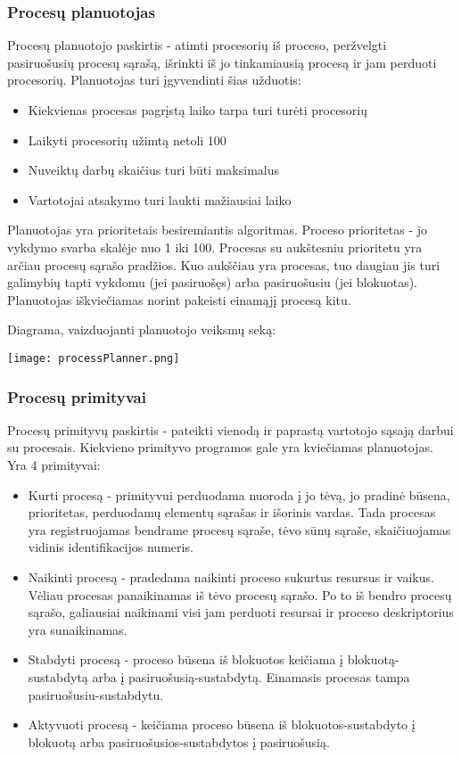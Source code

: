 \subsubsection{Procesų planuotojas}
Procesų planuotojo paskirtis - atimti procesorių iš proceso, peržvelgti pasiruošusių procesų sąrašą, išrinkti iš jo tinkamiausią procesą ir jam perduoti procesorių.
Planuotojas turi įgyvendinti šias užduotis:
	\begin{itemize}
		\item Kiekvienas procesas pagrįstą laiko tarpa turi turėti procesorių
		\item Laikyti procesorių užimtą netoli 100%
		\item Nuveiktų darbų skaičius turi būti maksimalus
		\item Vartotojai atsakymo turi laukti mažiausiai laiko
	\end{itemize}

Planuotojas yra prioritetais besiremiantis algoritmas. Proceso prioritetas - jo vykdymo svarba skalėje nuo 1 iki 100. Procesas su aukštesniu prioritetu yra arčiau procesų sąrašo pradžios.
Kuo aukščiau yra procesas, tuo daugiau jis turi galimybių tapti vykdomu (jei pasiruošęs) arba pasiruošusiu (jei blokuotas). Planuotojas iškviečiamas norint pakeisti einamąjį procesą kitu.

Diagrama, vaizduojanti planuotojo veiksmų seką:

\texttt{[image: processPlanner.png]}

\subsubsection{Procesų primityvai}
Procesų primityvų paskirtis - pateikti vienodą ir paprastą vartotojo sąsają darbui su procesais. Kiekvieno primityvo programos gale yra kviečiamas planuotojas. Yra 4 primityvai:
	\begin{itemize}
		\item Kurti procesą - primityvui perduodama nuoroda į jo tėvą, jo pradinė būsena, prioritetas, perduodamų elementų sąrašas ir išorinis vardas.
			Tada procesas yra registruojamas bendrame procesų sąraše, tėvo sūnų sąraše, skaičiuojamas vidinis identifikacijos numeris.
		\item Naikinti procesą - pradedama naikinti proceso sukurtus resursus ir vaikus. Vėliau procesas panaikinamas iš tėvo procesų sąrašo. Po to iš bendro procesų sąrašo, galiausiai
			naikinami visi jam perduoti resursai ir proceso deskriptorius yra sunaikinamas.
		\item Stabdyti procesą - proceso būsena iš blokuotos keičiama į blokuotą-sustabdytą arba į pasiruošusią-sustabdytą. Einamasis procesas tampa pasiruošusiu-sustabdytu.
		\item Aktyvuoti procesą - keičiama proceso būsena iš blokuotos-sustabdyto į blokuotą arba pasiruošusios-sustabdytos į pasiruošusią.
	\end{itemize}

